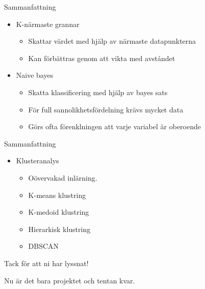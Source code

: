 \documentclass[10pt,english]{beamer}
\begin{document}
\begin{frame}{Sammanfattning}
    
    \begin{itemize}
        \item K-närmaste grannar
        \begin{itemize}
            \item Skattar värdet med hjälp av närmaste datapunkterna
            \item Kan förbättras genom att vikta med avståndet
        \end{itemize}
        \item Naive bayes
        \begin{itemize}
            \item Skatta klassificering med hjälp av bayes sats
            \item För full sannolikhetsfördelning krävs mycket data
            \item Görs ofta förenklningen att varje variabel är oberoende
        \end{itemize}
    \end{itemize}

\end{frame}

\begin{frame}{Sammanfattning}
    
    \begin{itemize}
        \item Klusteranalys
        \begin{itemize}
            \item Oövervakad inlärning.
            \item K-means klustring
            \item K-medoid klustring
            \item Hierarkisk klustring
            \item DBSCAN
        \end{itemize}
    \end{itemize}

\end{frame}



\begin{frame}[standout]
    \Huge Tack för att ni har lyssnat!

    \large Nu är det bara projektet och tentan kvar.
\end{frame}
\end{document}
